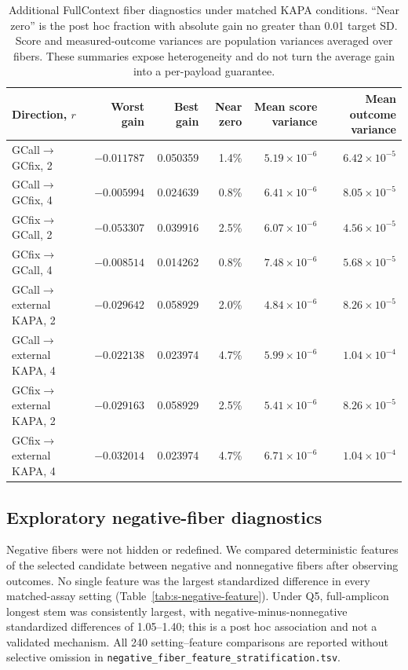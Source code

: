 \documentclass[10pt]{article}
\begin{document}
\begin{table}[H]
\centering
\scriptsize
\begin{tabular}{lrrrrr}
\toprule
Direction, $r$ & Worst gain & Best gain & Near zero & Mean score variance & Mean outcome variance\\
\midrule
GCall$\rightarrow$GCfix, 2 & $-0.011787$ & 0.050359 & 1.4\% & $5.19\times10^{-6}$ & $6.42\times10^{-5}$\\
GCall$\rightarrow$GCfix, 4 & $-0.005994$ & 0.024639 & 0.8\% & $6.41\times10^{-6}$ & $8.05\times10^{-5}$\\
GCfix$\rightarrow$GCall, 2 & $-0.053307$ & 0.039916 & 2.5\% & $6.07\times10^{-6}$ & $4.56\times10^{-5}$\\
GCfix$\rightarrow$GCall, 4 & $-0.008514$ & 0.014262 & 0.8\% & $7.48\times10^{-6}$ & $5.68\times10^{-5}$\\
GCall$\rightarrow$external KAPA, 2 & $-0.029642$ & 0.058929 & 2.0\% & $4.84\times10^{-6}$ & $8.26\times10^{-5}$\\
GCall$\rightarrow$external KAPA, 4 & $-0.022138$ & 0.023974 & 4.7\% & $5.99\times10^{-6}$ & $1.04\times10^{-4}$\\
GCfix$\rightarrow$external KAPA, 2 & $-0.029163$ & 0.058929 & 2.5\% & $5.41\times10^{-6}$ & $8.26\times10^{-5}$\\
GCfix$\rightarrow$external KAPA, 4 & $-0.032014$ & 0.023974 & 4.7\% & $6.71\times10^{-6}$ & $1.04\times10^{-4}$\\
\bottomrule
\end{tabular}
\caption{Additional FullContext fiber diagnostics under matched KAPA conditions. ``Near zero'' is the post hoc fraction with absolute gain no greater than 0.01 target SD. Score and measured-outcome variances are population variances averaged over fibers. These summaries expose heterogeneity and do not turn the average gain into a per-payload guarantee.}
\label{tab:s-negative-fiber-diagnostics}
\end{table}

\subsection{Exploratory negative-fiber diagnostics}

Negative fibers were not hidden or redefined. We compared deterministic features of the selected candidate between negative and nonnegative fibers after observing outcomes. No single feature was the largest standardized difference in every matched-assay setting (Table~\ref{tab:s-negative-feature}). Under Q5, full-amplicon longest stem was consistently largest, with negative-minus-nonnegative standardized differences of 1.05--1.40; this is a post hoc association and not a validated mechanism. All 240 setting--feature comparisons are reported without selective omission in \texttt{negative\_fiber\_feature\_stratification.tsv}.
\end{document}
